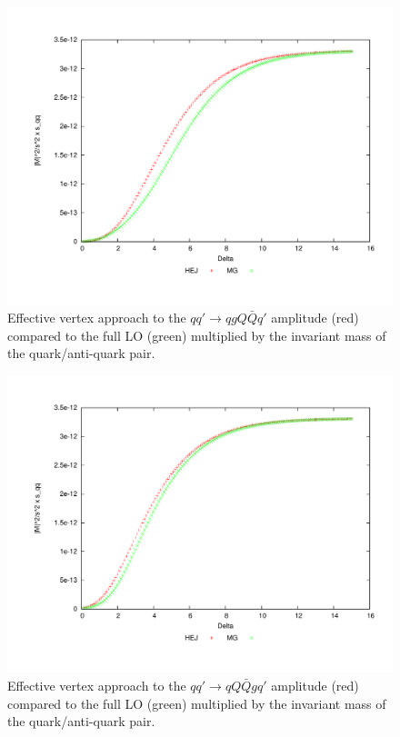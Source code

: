\begin{figure}[H]
\centering
\includegraphics[scale=0.44]{Images/qQ_qgqqxQ_sqq.pdf}
\caption{Effective vertex approach to the $qq' \to qgQ\bar{Q}q'$ amplitude (red) compared to the full LO (green) multiplied by the invariant mass of the quark/anti-quark pair.}
\label{fig:central_gfor}
\end{figure}

\begin{figure}[H]
\centering
\includegraphics[scale=0.44]{Images/qQ_qqqxgQ_sqq.pdf}
\caption{Effective vertex approach to the $qq' \to qQ\bar{Q}gq'$ amplitude (red) compared to the full LO (green) multiplied by the invariant mass of the quark/anti-quark pair.}
\label{fig:central_gback}
\end{figure}

